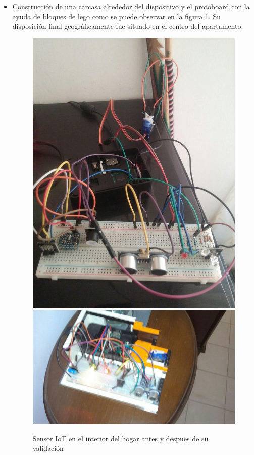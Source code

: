 \begin{itemize}
\item Construcción de una carcasa alrededor del dispositivo y el protoboard con la ayuda de bloques de lego como se puede observar en la figura \ref{fig:rpi3javier_indoor}. Su disposición final geográficamente fue situado en el centro del apartamento.
\begin{figure}[!htb]
\centering
\includegraphics[scale=0.165]{./Figuras/rpi3javier_proto.jpg}
\includegraphics[scale=0.22]{./Figuras/rpi3javier_final.jpg}
\caption{Sensor IoT en el interior del hogar antes y despues de su validación}
\label{fig:rpi3javier_indoor}
\vspace*{-10pt}
\end{figure}
\end{itemize} 

